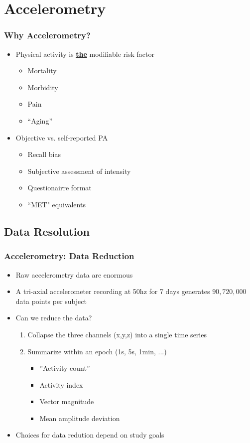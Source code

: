 \documentclass[10pt]{beamer}\usepackage[]{graphicx}\usepackage[]{color}
\begin{document}
\section{Accelerometry}
\begin{frame}
\frametitle{Why Accelerometry?}
\begin{itemize}
\item Physical activity is \underline{\textbf{the}} modifiable risk factor
    \begin{itemize}
    \item Mortality 
    \item Morbidity
    \item Pain
    \item ``Aging''
    \end{itemize}
\item Objective vs. self-reported PA 
    \begin{itemize}
    \item Recall bias
    \item Subjective assessment of intensity 
    \item Questionairre format
    \item ``MET" equivalents
    \end{itemize}
\end{itemize}
\end{frame}


\subsection{Data Resolution}

\begin{frame}
\frametitle{Accelerometry: Data Reduction}
\begin{itemize}
\item Raw accelerometry data are enormous
\item A tri-axial accelerometer recording at 50hz for 7 days generates $90,720,000$ data points per subject
\item Can we reduce the data? 
    \begin{enumerate}
    \item Collapse the three channels (x,y,z) into a single time series
    \item Summarize within an epoch (1s, 5s, 1min, ...)
        \begin{itemize}
        \item ''Activity count''
        \item Activity index
        \item Vector magnitude
        \item Mean amplitude deviation
        \end{itemize}
    \end{enumerate}
\item Choices for data redution depend on study goals
\end{itemize}
\end{frame}
\end{document}
